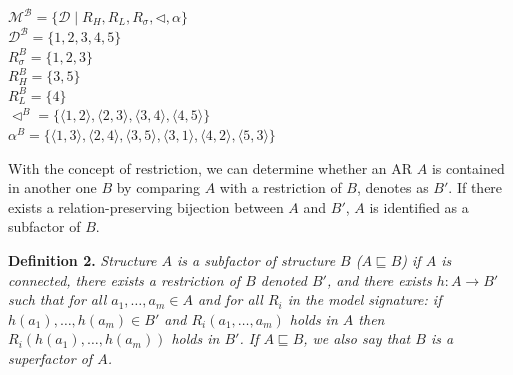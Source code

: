 \documentclass[11pt,letterpaper]{article}
\begin{document}
\begin{multicols}{2}
	\ea\label{ex:restr2}

\begin{minipage}{\linewidth}
	$\mathcal{M^B} = \{\mathcal{D} \mid R_H, R_L, R_\sigma, \lhd, \alpha \}$\\
	$\mathcal{D^B} = \{1, 2, 3, 4, 5\}$\\
	$R^B_\sigma = \{1, 2, 3\}$ \\
	$R^B_H = \{3, 5\}$ \\
	$R^B_L = \{4\}$ \\
	$\lhd^B = \{\langle 1,2\rangle, \langle 2, 3\rangle,\langle 3,4\rangle, \langle4,5\rangle   \}$ \\
	$\alpha^B = \{\langle 1,3\rangle, \langle 2,4\rangle, \langle 3, 5\rangle, \langle 3,1\rangle, \langle 4,2\rangle, \langle 5,3\rangle  \}$ 
\end{minipage}
\z
\end{multicols}

With the concept of restriction, we can determine whether an AR $A$ is contained in another one $B$ by comparing \(A\) with a restriction of $B$, denotes as $B'$. If there exists a relation-preserving bijection between $A$ and $B'$, \(A\) is identified as a subfactor of $B$.

\textbf{Definition 2.} \textit{Structure $A$ is a subfactor of structure $B$ ($A \sqsubseteq B$) if $A$ is connected, there exists a restriction of $B$ denoted $B'$, and there exists $h:A \rightarrow B'$ such that for all $a_1, \ldots, a_m \in A$ and for all $R_i$ in the model signature: if $h(a_1), \ldots, h(a_m) \in B'$ and $R_i(a_1, \ldots, a_m)$ holds in $A$ then $R_i(h(a_1), \ldots, h(a_m))$ holds in $B'$. If $A \sqsubseteq B$, we also say that $B$ is a superfactor of $A$.}
\end{document}
